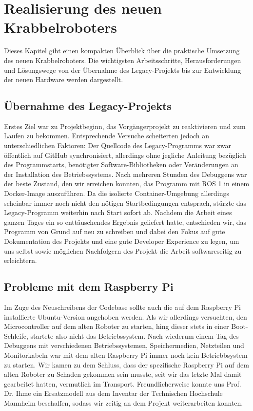 \section{Realisierung des neuen Krabbelroboters}
\label{sec:realisierung}

Dieses Kapitel gibt einen kompakten Überblick über die praktische Umsetzung des neuen Krabbelroboters. Die wichtigsten Arbeitsschritte, Herausforderungen und \linebreak Lösungswege von der Übernahme des Legacy-Projekts bis zur Entwicklung der neuen Hardware werden dargestellt.

\subsection{Übernahme des Legacy-Projekts}

Erstes Ziel war zu Projektbeginn, das Vorgängerprojekt zu reaktivieren und zum Laufen zu bekommen. Entsprechende Versuche scheiterten jedoch an unterschiedlichen Faktoren: Der Quellcode des Legacy-Programms war zwar öffentlich auf GitHub synchronisiert, allerdings ohne jegliche Anleitung bezüglich des Programmstarts, benötigter Software-Bibliotheken oder Veränderungen an der Installation des Betriebssystems. Nach mehreren Stunden des Debuggens war der beste Zustand, den wir erreichen konnten, das Programm mit ROS 1 in einem Docker-Image auszuführen. Da die isolierte Container-Umgebung allerdings scheinbar immer noch nicht den nötigen Startbedingungen entsprach, stürzte das Legacy-Programm weiterhin nach Start sofort ab. Nachdem die Arbeit eines ganzen Tages ein so enttäuschendes Ergebnis geliefert hatte, entschieden wir, das Programm von Grund auf neu zu schreiben und dabei den Fokus auf gute Dokumentation des Projekts und eine gute Developer Experience zu legen, um uns selbst sowie möglichen Nachfolgern des Projekt die Arbeit softwareseitig zu erleichtern.

\subsection{Probleme mit dem Raspberry Pi}

Im Zuge des Neuschreibens der Codebase sollte auch die auf dem Raspberry Pi installierte Ubuntu-Version angehoben werden. Als wir allerdings versuchten, den Microcontroller auf dem alten Roboter zu starten, hing dieser stets in einer Boot-Schleife, startete also nicht das Betriebssystem. Nach wiederum einem Tag des Debuggens mit verschiedenen Betriebssystemen, Speichermedien, Netzteilen und Monitorkabeln war mit dem alten Raspberry Pi immer noch kein Betriebbsystem zu starten. Wir kamen zu dem Schluss, dass der spezifische Raspberry Pi auf dem alten Roboter zu Schaden gekommen sein musste, seit wir das letzte Mal damit gearbeitet hatten, vermutlich im Transport. Freundlicherweise konnte uns Prof. Dr. Ihme ein Ersatzmodell aus dem Inventar der Technischen Hochschule Mannheim beschaffen, sodass wir zeitig an dem Projekt weiterarbeiten konnten.

